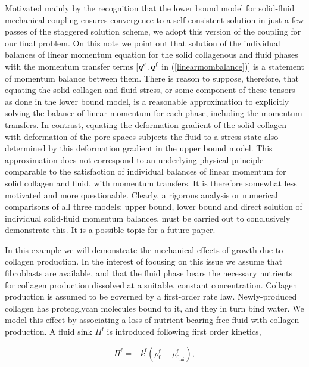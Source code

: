 Motivated mainly by the recognition that the lower bound model for
solid-fluid mechanical coupling ensures convergence to a self-consistent
solution in just a few passes of the staggered solution scheme, we
adopt this version of the coupling for our final problem. On this
  note we point out that solution of the individual balances of linear
  momentum equation for the solid collagenous and fluid phases with
  the momentum transfer terms [$\mbox{\boldmath$ q$}^\mathrm{c}, \mbox{\boldmath$ q$}^\mathrm{f}$ in
  (\ref{linearmombalance})] is a
  statement of momentum balance between them. There is reason to
  suppose, therefore, that equating the solid collagen and fluid
  stress, or some component of these tensors as done in the lower
  bound model, is a reasonable approximation to explicitly solving the
  balance of linear momentum for each phase, including the momentum
  transfers. In contrast, equating the 
  deformation gradient of the solid collagen with deformation of the
  pore spaces subjects the fluid to a stress state also determined by
  this deformation gradient in the upper bound model. This
  approximation does not correspond to an underlying physical
  principle comparable to the satisfaction of individual
  balances of linear momentum for solid collagen and fluid, with
  momentum transfers. It is therefore somewhat less motivated and more
  questionable. Clearly, a rigorous analysis or numerical
  comparisons of all three models:
  upper bound, lower bound and direct solution of individual
  solid-fluid momentum balances, must be carried out to conclusively
  demonstrate this. It is a possible topic for a future paper.

In this example we will demonstrate the mechanical
effects of growth due to collagen production. In the interest of
focusing on this issue we assume that fibroblasts are
available, and that the fluid
phase bears the necessary nutrients for
collagen production dissolved at a suitable, constant
concentration. Collagen production is assumed to be governed by a
first-order rate 
law. Newly-produced collagen has proteoglycan molecules bound to it,
and they in turn bind water. We model this effect by associating a
loss of nutrient-bearing 
free fluid with collagen production. A fluid sink $\Pi^\mathrm{f}$ is
introduced following first order kinetics,

\begin{equation}
\Pi^\mathrm{f} = -k^\mathrm{f}(\rho_0^\mathrm{f}
- \rho_{0_\mathrm{ini}}^\mathrm{f}),
\end{equation}


